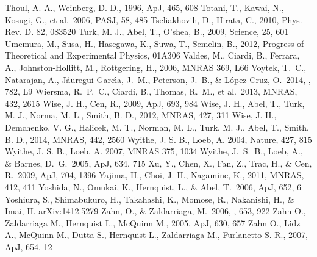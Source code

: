 \begin{thebibliography}{99}
\begin{multicols}{2}
{ Thoul, A. A., Weinberg, D. D., 1996, ApJ, 465, 608
 Totani, T., Kawai, N., Kosugi, G., et al.\ 2006, PASJ, 58, 485 
 Tseliakhovih, D., Hirata, C., 2010, Phys. Rev. D. 82, 083520
 Turk, M. J., Abel, T., O'shea, B., 2009, Science, 25, 601
 Umemura, M., Susa, H., Hasegawa, K., Suwa, T., Semelin, B., 2012, Progress of Theoretical and Experimental Physics, 01A306
 Valdes, M., Ciardi, B., Ferrara, A., Johnston-Hollitt, M., Rottgering, H., 2006, MNRAS 369, L66
 Voytek, T.~C., Natarajan, A., J{\'a}uregui Garc{\'{\i}}a, J.~M., Peterson, J.~B., \& L{\'o}pez-Cruz, O.\ 2014, \apjl, 782, L9 
Wiersma, R.~P.~C., Ciardi, B., Thomas, R.~M., et al.\ 2013, MNRAS, 432, 2615 
 Wise, J. H., Cen, R., 2009, ApJ, 693, 984
 Wise, J. H., Abel, T., Turk, M. J., Norma, M. L., Smith, B. D., 2012, MNRAS, 427, 311
 Wise, J. H., Demchenko, V. G., Halicek, M. T., Norman, M. L., Turk, M. J., Abel, T., Smith, B. D., 2014, MNRAS, 442, 2560
 Wyithe, J. S. B., Loeb, A. 2004, Nature, 427, 815
 Wyithe, J. S. B., Loeb, A. 2007, MNRAS 375, 1034
 Wyithe, J.~S.~B., Loeb, A., \& Barnes, D.~G.\ 2005, ApJ, 634, 715 
 Xu, Y., Chen, X., Fan, Z., Trac, H., \& Cen, R.\ 2009, ApJ, 704, 1396 
 Yajima, H., Choi, J.-H., Nagamine, K., 2011, MNRAS, 412, 411
 Yoshida, N., Omukai, K., Hernquist, L., \& Abel, T.\ 2006, ApJ, 652, 6 
 Yoshiura, S., Shimabukuro, H., Takahashi, K., Momose, R., Nakanishi, H., \& Imai, H. arXiv:1412.5279
 Zahn, O., \& Zaldarriaga, M.\ 2006, \apj, 653, 922 
 Zahn O., Zaldarriaga M., Hernquist L., McQuinn M., 2005, ApJ, 630, 657
 Zahn O., Lidz A., McQuinn M., Dutta S., Hernquist L., Zaldarriaga M., Furlanetto S. R., 2007, ApJ, 654, 12
}
\end{multicols}
\end{thebibliography}
